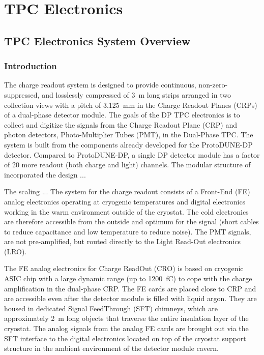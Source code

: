 \chapter{TPC Electronics}
\label{ch:fddp-tpc-elec}


\section{TPC Electronics System Overview}
\label{sec:fddp-tpc-elec-ov}

\subsection{Introduction}
\label{sec:fddp-tpc-elec-intro}

The charge readout system is designed to provide continuous, non-zero-suppressed, and losslessly compressed of \SI{3}{m} long strips arranged in two collection views with a pitch of \SI{3.125}{mm} in the Charge Readout Planes (CRPs) of a dual-phase detector module. The goals of the DP TPC electronics is to collect and digitize the signals from the Charge Readout Plane (CRP) and photon detectors, Photo-Multiplier Tubes (PMT), in the Dual-Phase TPC. The system is built from the components already developed for the ProtoDUNE-DP detector. Compared to ProtoDUNE-DP, a single DP detector module has a factor of 20 more readout (both charge and light) channels. The modular structure of incorporated the design ... 

The scaling ...  
The system for the charge readout consists of a Front-End (FE) analog electronics operating at cryogenic temperatures and digital electronics working in the warm environment outside of the cryostat. The cold electronics are therefore accessible from the outside and optimum for the signal (short cables to reduce capacitance and low temperature to reduce noise).  The PMT signals, are not pre-amplified, but routed directly to the Light Read-Out electronics (LRO).


The FE analog electronics for Charge ReadOut (CRO) is based on cryogenic ASIC chip with a large dynamic range (up to \SI{1200}{fC}) to cope with the charge amplification in the dual-phase CRP. The FE cards are placed close to CRP and are accessible even after the detector module is filled with liquid argon. They are housed in dedicated Signal FeedThrough (SFT) chimneys, which are approximately \SI{2}{m} long objects that traverse the entire insulation layer of the cryostat.  The analog signals from the analog FE cards are brought out via the SFT interface to the digital electronics located on top of the cryostat support structure in the ambient environment of the detector module cavern. 

